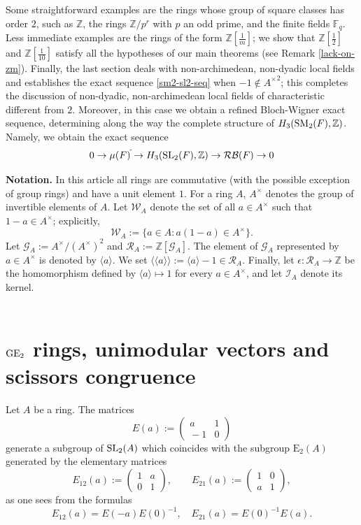 \documentclass[11pt]{amsart}
\theoremstyle{definition}
\theoremstyle{plain}
\theoremstyle{definition}
\numberwithin{equation}{section}
\newcommand{\z}{\mathbb{Z}}
\newcommand{\F}{\mathbb{F}}
\newcommand{\GG}{\mathcal{G}}
\newcommand{\RR}{\mathcal{R}}
\newcommand{\WW}{\mathcal{W}}
\newcommand{\II}{\mathcal{I}}
\newcommand{\RB}{\mathcal{RB}}
\renewcommand{\aa}{{A^\times}}
\newcommand{\mth}[1]{\left[ \frac{1}{#1} \right]}
\newcommand{\lan}{\langle}
\newcommand{\ran}{\rangle}
\newcommand{\Lan}{\langle \! \langle}
\newcommand{\Ran}{\rangle \! \rangle}
\newcommand{\GE}{{\rm GE}}
\newcommand{\Ee}{\mathrm{E}}
\newcommand{\SL}{\mathit{{\rm SL}}}
\newcommand{\SM}{\mathit{{\rm SM}}}
\newcommand{\mtxx}[4]
{\left(\!\!
	\begin{array}{cc}
		\!\!#1 & \!\!#2\\
		\!\!#3 & \!\!#4
	\end{array}\!\!
	\right)}
\begin{document}
	Some straightforward examples are the rings whose group of square classes has order $2$, such as $\z$, the rings $\z/p^r$ with $p$ an odd prime, and the finite fields $\F_q$. Less immediate examples are the rings of the form $\z\mth{m}$; we show that $\z\mth{2}$ and $\z\mth{10}$ satisfy all the hypotheses of our main theorems (see Remark \ref{lack-on-zm}). Finally, the last section deals with non-archimedean, non-dyadic local fields and establishes the exact sequence \eqref{sm2-sl2-seq} when $-1\notin\aa^2$; this completes the discussion of non-dyadic, non-archimedean local fields of characteristic different from $2$. Moreover, in this case we obtain a refined Bloch-Wigner exact sequence, determining along the way the complete structure of $H_3(\SM_2(F),\z)$. Namely, we obtain the exact sequence
	\[
	0\to\mu(F)^{\tilde{}}\to H_3(\SL_2(F),\z)\to \RB(F)\to 0
	\]
	
	{\bf Notation.} In this article all rings are commutative (with the possible exception of group rings) and have a unit element $1$. For a ring $A$, $\aa$ denotes the group of invertible elements of $A$. 
	Let $\WW_A$ denote the set of all $a\in \aa$ such that $1-a\in \aa$; explicitly,
	\[
	\WW_A:=\{a\in A: a(1-a)\in \aa\}.
	\]
	Let $\GG_A:=\aa/(\aa)^2$ and $\RR_A:=\z[\GG_A]$. The element of $\GG_A$ represented by 
	$a \in \aa$ is denoted by $\lan a \ran$. We set $\Lan a\Ran:=\lan a\ran -1\in \RR_A$. Finally, let $\epsilon:\RR_A\to\z$ be the homomorphism defined by $\lan a\ran\mapsto1$ for every $a\in\aa$, and let $\II_A$ denote its kernel.\\
	~\\
	\section{\texorpdfstring{$\GE_2$}{GE2} rings, unimodular vectors and scissors congruence}
	Let $A$ be a ring. The matrices
	\[
	E(a):=\mtxx{a}{1}{-1}{0}
	\]
	generate a subgroup of $\SL_2(A)$ which coincides with the subgroup $\Ee_2(A)$ generated by the elementary matrices
	\[
	E_{12}(a):=\mtxx{1}{a}{0}{1},\quad \quad E_{21}(a):=\mtxx{1}{0}{a}{1}, 
	\]
	as one sees from the formulas
	\[
	E_{12}(a)=E(-a)E(0)^{-1}, \quad E_{21}(a)=E(0)^{-1}E(a).
	\]
	
\end{document}
